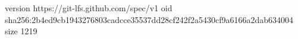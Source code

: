 version https://git-lfs.github.com/spec/v1
oid sha256:2b4ed9cb1943276803cadcce35537dd28cf242f2a5430cf9a6166a2dab634004
size 1219

